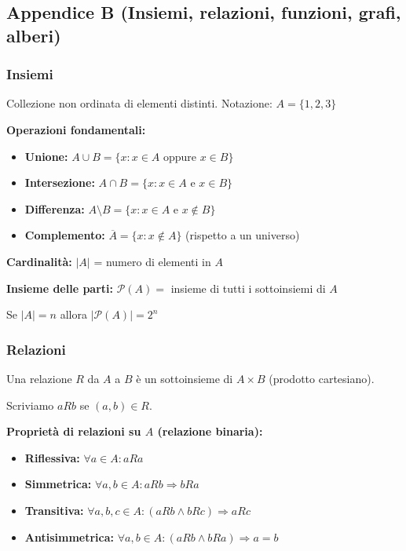 \subsection{Appendice B (Insiemi, relazioni, funzioni, grafi, alberi)}

\subsubsection{Insiemi}

\begin{definizione}[Insieme]
	Collezione non ordinata di elementi distinti. Notazione: $A = \{1, 2, 3\}$
\end{definizione}

\textbf{Operazioni fondamentali:}
\begin{itemize}
	\item \textbf{Unione:} $A \cup B = \{x : x \in A \text{ oppure } x \in B\}$
	\item \textbf{Intersezione:} $A \cap B = \{x : x \in A \text{ e } x \in B\}$
	\item \textbf{Differenza:} $A \setminus B = \{x : x \in A \text{ e } x \notin B\}$
	\item \textbf{Complemento:} $\overline{A} = \{x : x \notin A\}$ (rispetto a un universo)
\end{itemize}

\begin{nota}
	\textbf{Cardinalità:} $|A|$ = numero di elementi in $A$
	
	\textbf{Insieme delle parti:} $\mathcal{P}(A) = $ insieme di tutti i sottoinsiemi di $A$
	
	Se $|A| = n$ allora $|\mathcal{P}(A)| = 2^n$
\end{nota}

\subsubsection{Relazioni}

\begin{definizione}[Relazione]
	Una relazione $R$ da $A$ a $B$ è un sottoinsieme di $A \times B$ (prodotto cartesiano).
	
	Scriviamo $aRb$ se $(a,b) \in R$.
\end{definizione}

\textbf{Proprietà di relazioni su $A$ (relazione binaria):}
\begin{itemize}
	\item \textbf{Riflessiva:} $\forall a \in A: aRa$
	\item \textbf{Simmetrica:} $\forall a,b \in A: aRb \Rightarrow bRa$
	\item \textbf{Transitiva:} $\forall a,b,c \in A: (aRb \land bRc) \Rightarrow aRc$
	\item \textbf{Antisimmetrica:} $\forall a,b \in A: (aRb \land bRa) \Rightarrow a = b$
\end{itemize}

